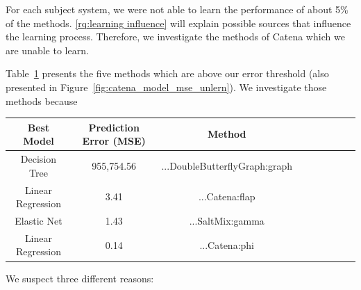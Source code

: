 
For each subject system, we were not able to learn the performance of about 5\% of the methods. \ref{rq:learning influence} will explain possible sources that influence the learning process. Therefore, we investigate the methods of Catena which we are unable to learn. 

Table~\ref{tbl:unlearnable_methods_catena} presents the five methods which are above our error threshold (also presented in Figure~\ref{fig:catena_model_mse_unlern}). We investigate those methods because 


\begin{table}[h]
	\centering %
    \begin{tabular}{*{9}{c}}
    	\toprule
        Best Model 			& Prediction Error (\ac{MSE}) & Method \\
        \toprule
        Decision Tree 		& 955,754.56 				& ...DoubleButterflyGraph:graph \\
        \midrule
		Linear Regression 	& 3.41 						& ...Catena:flap \\
        \midrule
		Elastic Net 		& 1.43 						& ...SaltMix:gamma \\
        \midrule
		Linear Regression 	& 0.14 						& ...Catena:phi \\
        \bottomrule
    \end{tabular}
    \label{tbl:unlearnable_methods_catena}
\end{table}

We suspect three different reasons:

